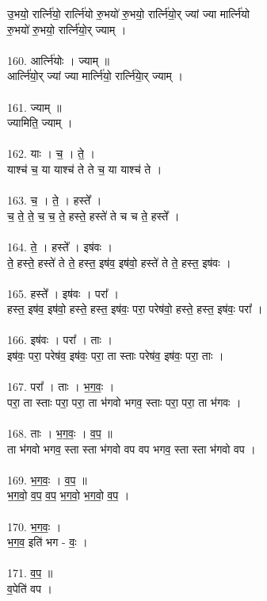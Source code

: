 उ॒भयो॒ रार्त्नि॑यो॒ रार्त्नि॑यो रु॒भयो॑ रु॒भयो॒ रार्त्नि॑यो॒र् ज्यां ज्या मार्त्नि॑यो\\
रु॒भयो॑ रु॒भयो॒ रार्त्नि॑यो॒र् ज्याम् ।\\
\\
160. आर्त्नि॑योः । ज्याम् ॥\\
आर्त्नि॑यो॒र् ज्यां ज्या मार्त्नि॑यो॒ रार्त्नि॑याे॒र् ज्याम् ।\\
\\
161. ज्याम् ॥\\
ज्यामिति॒ ज्याम् ।\\
\\
162. याः । च॒ । ते॒ ।\\
याश्च॑ च॒ या याश्च॑ ते ते च॒ या याश्च॑ ते ।\\
\\
163. च॒ । ते॒ । हस्ते᳚ ।\\
च॒ ते॒ ते॒ च॒ च॒ ते॒ हस्ते॒ हस्ते॑ ते च च ते॒ हस्ते᳚ ।\\
\\
164. ते॒ । हस्ते᳚ । इष॑वः ।\\
ते॒ हस्ते॒ हस्ते॑ ते ते॒ हस्त॒ इष॑व॒ इष॑वो॒ हस्ते॑ ते ते॒ हस्त॒ इष॑वः ।\\
\\
165. हस्ते᳚ । इष॑वः । परा᳚ ।\\
हस्त॒ इष॑व॒ इष॑वो॒ हस्ते॒ हस्त॒ इष॑वः॒ परा॒ परेष॑वो॒ हस्ते॒ हस्त॒ इष॑वः॒ परा᳚ ।\\
\\
166. इष॑वः । परा᳚ । ताः ।\\
इष॑वः॒ परा॒ परेष॑व॒ इष॑वः॒ परा॒ ता स्ताः परेष॑व॒ इष॑वः॒ परा॒ ताः ।\\
\\
167. परा᳚ । ताः । भ॒ग॒वः॒ ।\\
परा॒ ता स्ताः परा॒ परा॒ ता भ॑गवो भगव॒ स्ताः परा॒ परा॒ ता भ॑गवः ।\\
\\
168. ताः । भ॒ग॒वः॒ । व॒प॒ ॥\\
ता भ॑गवो भगव॒ स्ता स्ता भ॑गवो वप वप भगव॒ स्ता स्ता भ॑गवो वप ।\\
\\
169. भ॒ग॒वः॒ । व॒प॒ ॥\\
भ॒ग॒वो॒ व॒प॒ व॒प॒ भ॒ग॒वो॒ भ॒ग॒वो॒ व॒प॒ ।\\
\\
170. भ॒ग॒वः॒ ।\\
भ॒ग॒व॒ इति॑ भग - वः॒ ।\\
\\
171. व॒प॒ ॥\\
व॒पेति॑ वप ।\\
